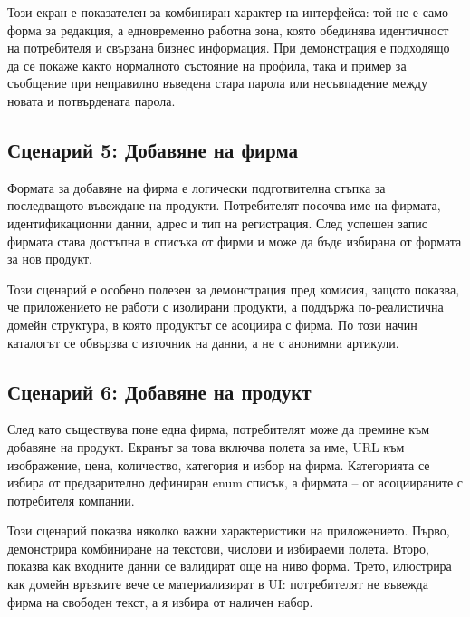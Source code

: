 Този екран е показателен за комбиниран характер на интерфейса: той не е само форма за редакция, а едновременно работна зона, която обединява идентичност на потребителя и свързана бизнес информация. При демонстрация е подходящо да се покаже както нормалното състояние на профила, така и пример за съобщение при неправилно въведена стара парола или несъвпадение между новата и потвърдената парола.


\subsection{Сценарий 5: Добавяне на фирма}

Формата за добавяне на фирма е логически подготвителна стъпка за последващото въвеждане на продукти. Потребителят посочва име на фирмата, идентификационни данни, адрес и тип на регистрация. След успешен запис фирмата става достъпна в списъка от фирми и може да бъде избирана от формата за нов продукт.

Този сценарий е особено полезен за демонстрация пред комисия, защото показва, че приложението не работи с изолирани продукти, а поддържа по-реалистична домейн структура, в която продуктът се асоциира с фирма. По този начин каталогът се обвързва с източник на данни, а не с анонимни артикули.


\subsection{Сценарий 6: Добавяне на продукт}

След като съществува поне една фирма, потребителят може да премине към добавяне на продукт. Екранът за това включва полета за име, URL към изображение, цена, количество, категория и избор на фирма. Категорията се избира от предварително дефиниран enum списък, а фирмата -- от асоциираните с потребителя компании.

Този сценарий показва няколко важни характеристики на приложението. Първо, демонстрира комбиниране на текстови, числови и избираеми полета. Второ, показва как входните данни се валидират още на ниво форма. Трето, илюстрира как домейн връзките вече се материализират в UI: потребителят не въвежда фирма на свободен текст, а я избира от наличен набор.

